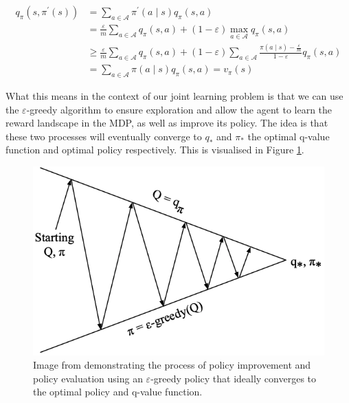 \documentclass{article}
\begin{document}
\begin{equation}
\begin{aligned} 
    q_\pi\left(s, \pi^{\prime}(s)\right) 
    &= \sum_{a \in \mathcal{A}} \pi^{\prime}(a \mid s) q_\pi(s, a) \\
    &= \frac{\varepsilon}{m} \sum_{a \in \mathcal{A}} q_\pi(s, a) + (1 - \varepsilon) \max_{a \in \mathcal{A}} q_\pi(s, a) \\
    &\geq \frac{\varepsilon}{m} \sum_{a \in \mathcal{A}} q_\pi(s, a) 
        + (1 - \varepsilon) \sum_{a \in \mathcal{A}} \frac{\pi(a \mid s) - \frac{\varepsilon}{m}}{1 - \varepsilon} q_\pi(s, a) \\
    &= \sum_{a \in \mathcal{A}} \pi(a \mid s) q_\pi(s, a) = v_\pi(s)
\end{aligned}	
\end{equation}

What this means in the context of our joint learning problem is that we can use the $\varepsilon$-greedy algorithm to ensure exploration and allow the agent to learn the reward landscape in the MDP, as well as improve its policy. The idea is that these two processes will eventually converge to $q_*$ and $\pi_*$ the optimal q-value function and optimal policy respectively. This is visualised in Figure \ref{fig:eval_improvement}.

\begin{figure}
	\centering
	\includegraphics[scale=0.4]{images/eval_improve.png}
	\caption{Image from \citet{silver2015rl} demonstrating the process of policy improvement and policy evaluation using an $\varepsilon$-greedy policy that ideally converges to the optimal policy and q-value function.}
	\label{fig:eval_improvement}
\end{figure}
\end{document}
